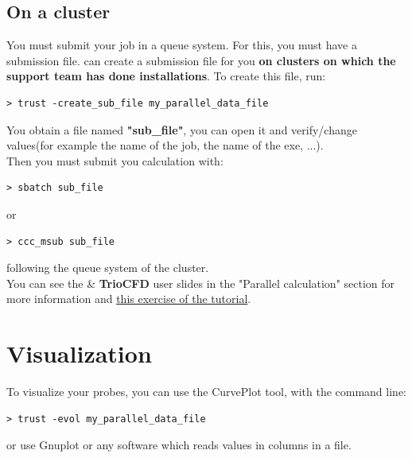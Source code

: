 \subsection{On a cluster}
You must submit your job in a queue system.
For this, you must have a submission file.
\trust can create a submission file for you \textbf{on clusters on which the support team has done installations}.
To create this file, run:
\begin{verbatim}
> trust -create_sub_file my_parallel_data_file
\end{verbatim}

You obtain a file named \textbf{"sub\_file"}, you can open it and verify/change values(for example the name of the job, the name of the exe, ...).\\

Then you must submit you calculation with:
\begin{verbatim}
> sbatch sub_file
\end{verbatim}
or 
\begin{verbatim}
> ccc_msub sub_file
\end{verbatim}
following the queue system of the cluster.\\


You can see the \trust \& \textbf{TrioCFD} user slides in the "Parallel calculation" section for more information and \href{TRUST_tutorial.pdf\#exo_para_3}{this exercise of the \trust tutorial}.


\section{Visualization}
To visualize your probes, you can use the CurvePlot tool, with the command line:
\begin{verbatim}
> trust -evol my_parallel_data_file
\end{verbatim}
or use Gnuplot or any software which reads values in columns in a file.\\

